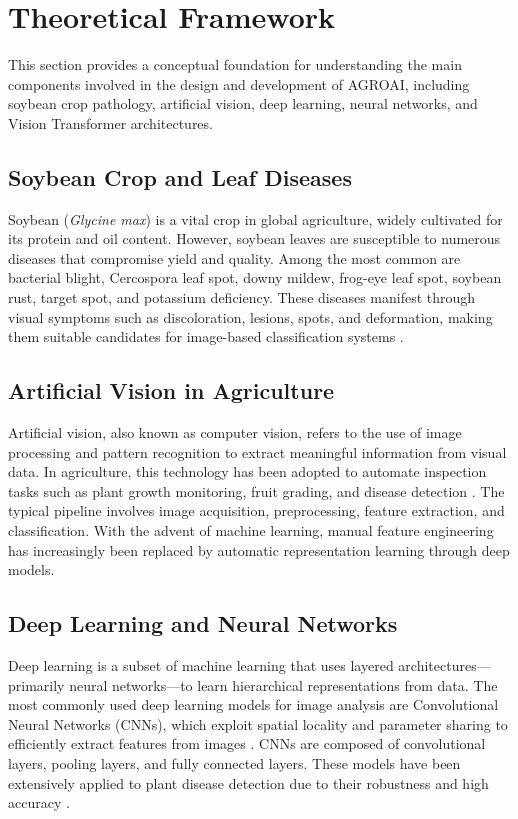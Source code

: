 \documentclass[preprint,12pt]{elsarticle}
\begin{document}
\section{Theoretical Framework}

This section provides a conceptual foundation for understanding the main components involved in the design and development of AGROAI, including soybean crop pathology, artificial vision, deep learning, neural networks, and Vision Transformer architectures.

\subsection{Soybean Crop and Leaf Diseases}

Soybean (\textit{Glycine max}) is a vital crop in global agriculture, widely cultivated for its protein and oil content. However, soybean leaves are susceptible to numerous diseases that compromise yield and quality. Among the most common are bacterial blight, Cercospora leaf spot, downy mildew, frog-eye leaf spot, soybean rust, target spot, and potassium deficiency. These diseases manifest through visual symptoms such as discoloration, lesions, spots, and deformation, making them suitable candidates for image-based classification systems \cite{Ferentinos2018DeepLA}.

\subsection{Artificial Vision in Agriculture}

Artificial vision, also known as computer vision, refers to the use of image processing and pattern recognition to extract meaningful information from visual data. In agriculture, this technology has been adopted to automate inspection tasks such as plant growth monitoring, fruit grading, and disease detection \cite{Mohanty2016UsingDL}. The typical pipeline involves image acquisition, preprocessing, feature extraction, and classification. With the advent of machine learning, manual feature engineering has increasingly been replaced by automatic representation learning through deep models.

\subsection{Deep Learning and Neural Networks}

Deep learning is a subset of machine learning that uses layered architectures—primarily neural networks—to learn hierarchical representations from data. The most commonly used deep learning models for image analysis are Convolutional Neural Networks (CNNs), which exploit spatial locality and parameter sharing to efficiently extract features from images \cite{Sladojevic2016DeepNN}. CNNs are composed of convolutional layers, pooling layers, and fully connected layers. These models have been extensively applied to plant disease detection due to their robustness and high accuracy \cite{Ferentinos2018DeepLA,Brahimi2017DeepLF}.
\end{document}
